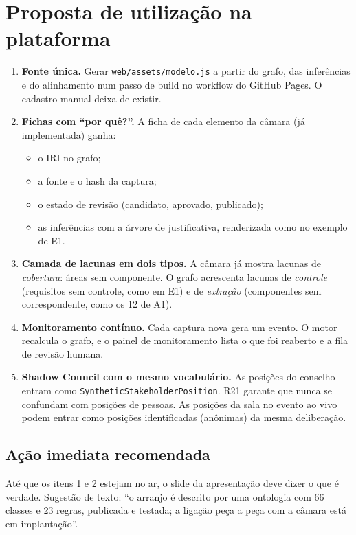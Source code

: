 \documentclass[12pt,a4paper,oneside,english,brazil]{abntex2}
\begin{document}
\chapter{Proposta de utilização na plataforma}\label{cap:uso}

\begin{enumerate}[leftmargin=*]
  \item \textbf{Fonte única.} Gerar \texttt{web/assets/modelo.js} a partir do grafo, das inferências e do alinhamento num passo de build no workflow do GitHub Pages. O cadastro manual deixa de existir.
  \item \textbf{Fichas com ``por quê?''.} A ficha de cada elemento da câmara (já implementada) ganha:
  \begin{itemize}
    \item o IRI no grafo;
    \item a fonte e o hash da captura;
    \item o estado de revisão (candidato, aprovado, publicado);
    \item as inferências com a árvore de justificativa, renderizada como no exemplo de E1.
  \end{itemize}
  \item \textbf{Camada de lacunas em dois tipos.} A câmara já mostra lacunas de \emph{cobertura}: áreas sem componente. O grafo acrescenta lacunas de \emph{controle} (requisitos sem controle, como em E1) e de \emph{extração} (componentes sem correspondente, como os 12 de A1).
  \item \textbf{Monitoramento contínuo.} Cada captura nova gera um evento. O motor recalcula o grafo, e o painel de monitoramento lista o que foi reaberto e a fila de revisão humana.
  \item \textbf{Shadow Council com o mesmo vocabulário.} As posições do conselho entram como \texttt{SyntheticStakeholderPosition}. R21 garante que nunca se confundam com posições de pessoas. As posições da sala no evento ao vivo podem entrar como posições identificadas (anônimas) da mesma deliberação.
\end{enumerate}

\section{Ação imediata recomendada}
Até que os itens 1 e 2 estejam no ar, o slide da apresentação deve dizer o que é verdade. Sugestão de texto: ``o arranjo é descrito por uma ontologia com 66 classes e 23 regras, publicada e testada; a ligação peça a peça com a câmara está em implantação''.
\end{document}
